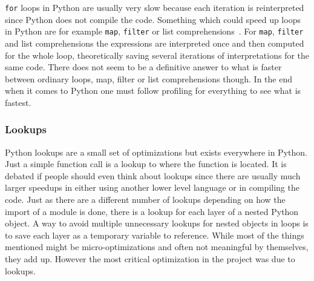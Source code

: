 \documentclass[12pt, a4paper]{article}
\begin{document}
\texttt{for} loops in Python are usually very slow because each iteration is reinterpreted since Python does not compile the code.
Something which could speed up loops in Python are for example \texttt{map}, \texttt{filter} or list comprehensions~\cite{Py:map, Py:filter, Py:listComprehension}. 
For \texttt{map}, \texttt{filter} and list comprehensions the expressions are interpreted once and then computed for the whole loop, theoretically saving several iterations of interpretations for the same code.
There does not seem to be a definitive answer to what is faster between ordinary loops, map, filter or list comprehensions though.
In the end when it comes to Python one must follow profiling for everything to see what is fastest.

\subsubsection{Lookups}

Python lookups are a small set of optimizations but exists everywhere in Python.
Just a simple function call is a lookup to where the function is located.
It is debated if people should even think about lookups since there are usually much larger speedups in either using another lower level language or in compiling the code.
Just as there are a different number of lookups depending on how the import of a module is done, there is a lookup for each layer of a nested Python object.
A way to avoid multiple unnecessary lookups for nested objects in loops is to save each layer as a temporary variable to reference.
While most of the things mentioned might be micro-optimizations and often not meaningful by themselves, they add up.
However the most critical optimization in the project was due to lookups.


\end{document}
